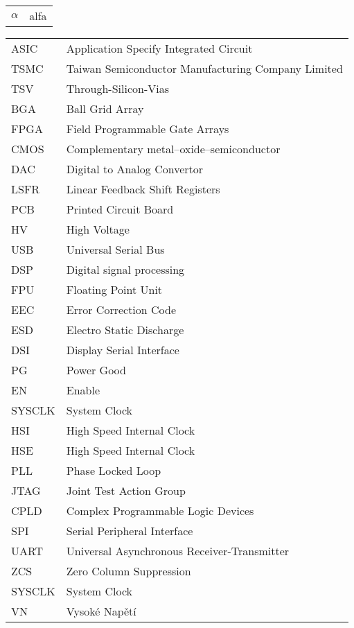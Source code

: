 \begin{tabular}{ l  l }
	
	$\alpha$ 			& alfa 				\\
	
\end{tabular}

\begin{tabular}{ l  l }
	
	ASIC & Application Specify Integrated Circuit \\
	TSMC & Taiwan Semiconductor Manufacturing Company Limited \\ 
	TSV	 & Through-Silicon-Vias \\
	BGA & Ball Grid Array \\
	FPGA & Field Programmable Gate Arrays \\
	CMOS & Complementary metal–oxide–semiconductor \\
	DAC & Digital to Analog Convertor \\
	LSFR & Linear Feedback Shift Registers \\
	PCB & Printed Circuit Board \\
	HV & High Voltage \\
	USB & Universal Serial Bus \\
	DSP & Digital signal processing \\
	FPU & Floating Point Unit \\
	EEC & Error Correction Code \\
	ESD & Electro Static Discharge \\
	DSI & Display Serial Interface \\
	PG & Power Good \\
	EN & Enable \\
	SYSCLK & System Clock \\
	HSI & High Speed Internal Clock \\
	HSE & High Speed Internal Clock \\
	PLL & Phase Locked Loop \\
	JTAG & Joint Test Action Group \\
	CPLD & Complex Programmable Logic Devices \\
	SPI & Serial Peripheral Interface \\
	UART & Universal Asynchronous Receiver-Transmitter \\
	ZCS & Zero Column Suppression \\
	SYSCLK & System Clock \\
	VN & Vysoké Napětí \\
	
	
		
\end{tabular}